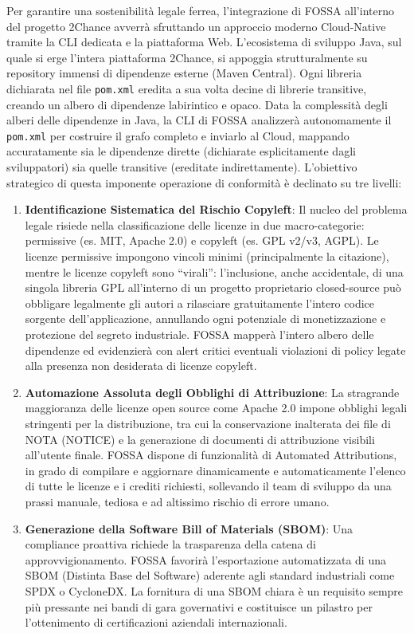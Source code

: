 Per garantire una sostenibilità legale ferrea, l'integrazione di FOSSA all'interno del progetto 2Chance avverrà sfruttando un approccio moderno Cloud-Native tramite la CLI dedicata e la piattaforma Web. L'ecosistema di sviluppo Java, sul quale si erge l'intera piattaforma 2Chance, si appoggia strutturalmente su repository immensi di dipendenze esterne (Maven Central). Ogni libreria dichiarata nel file \texttt{pom.xml} eredita a sua volta decine di librerie transitive, creando un albero di dipendenze labirintico e opaco. Data la complessità degli alberi delle dipendenze in Java, la CLI di FOSSA analizzerà autonomamente il \texttt{pom.xml} per costruire il grafo completo e inviarlo al Cloud, mappando accuratamente sia le dipendenze dirette (dichiarate esplicitamente dagli sviluppatori) sia quelle transitive (ereditate indirettamente). L'obiettivo strategico di questa imponente operazione di conformità è declinato su tre livelli:

\begin{enumerate}
    \item \textbf{Identificazione Sistematica del Rischio Copyleft}: Il nucleo del problema legale risiede nella classificazione delle licenze in due macro-categorie: permissive (es. MIT, Apache 2.0) e copyleft (es. GPL v2/v3, AGPL). Le licenze permissive impongono vincoli minimi (principalmente la citazione), mentre le licenze copyleft sono ``virali'': l'inclusione, anche accidentale, di una singola libreria GPL all'interno di un progetto proprietario closed-source può obbligare legalmente gli autori a rilasciare gratuitamente l'intero codice sorgente dell'applicazione, annullando ogni potenziale di monetizzazione e protezione del segreto industriale. FOSSA mapperà l'intero albero delle dipendenze ed evidenzierà con alert critici eventuali violazioni di policy legate alla presenza non desiderata di licenze copyleft.
    
    \item \textbf{Automazione Assoluta degli Obblighi di Attribuzione}: La stragrande maggioranza delle licenze open source come Apache 2.0 impone obblighi legali stringenti per la distribuzione, tra cui la conservazione inalterata dei file di NOTA (NOTICE) e la generazione di documenti di attribuzione visibili all'utente finale. FOSSA dispone di funzionalità di Automated Attributions, in grado di compilare e aggiornare dinamicamente e automaticamente l'elenco di tutte le licenze e i crediti richiesti, sollevando il team di sviluppo da una prassi manuale, tediosa e ad altissimo rischio di errore umano.
    
    \item \textbf{Generazione della Software Bill of Materials (SBOM)}: Una compliance proattiva richiede la trasparenza della catena di approvvigionamento. FOSSA favorirà l'esportazione automatizzata di una SBOM (Distinta Base del Software) aderente agli standard industriali come SPDX o CycloneDX. La fornitura di una SBOM chiara è un requisito sempre più pressante nei bandi di gara governativi e costituisce un pilastro per l'ottenimento di certificazioni aziendali internazionali.
\end{enumerate}


